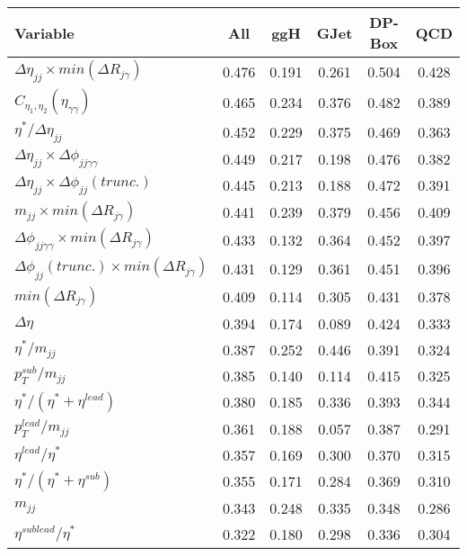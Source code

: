 \documentclass[a4paper,portrait]{article}
\begin{document}
\begin{center}
\begin{tabular}{| l || c | c | c | c | c |}
\hline
Variable & All & ggH & GJet & DP-Box & QCD \\ \hline
\rowcolor{Salmon}
$\Delta\eta_{jj}\times{min(\Delta{R}_{j\gamma})}$ & 0.476 & 0.191 & 0.261 & 0.504 & 0.428 \\ 
\rowcolor{Salmon}
$C_{\eta_{1},\eta_{2}}(\eta_{\gamma\gamma})$ & 0.465 & 0.234 & 0.376 & 0.482 & 0.389 \\ 
\rowcolor{Salmon}
$\eta^{*}/\Delta\eta_{jj}$ & 0.452 & 0.229 & 0.375 & 0.469 & 0.363 \\ 
\rowcolor{Salmon}
$\Delta\eta_{jj}\times\Delta\phi_{jj\gamma\gamma}$ & 0.449 & 0.217 & 0.198 & 0.476 & 0.382 \\ 
\rowcolor{Salmon}
$\Delta\eta_{jj}\times\Delta\phi_{jj}(trunc.)$ & 0.445 & 0.213 & 0.188 & 0.472 & 0.391 \\ 
\rowcolor{Salmon}
$m_{jj}\times{min(\Delta{R}_{j\gamma})}$ & 0.441 & 0.239 & 0.379 & 0.456 & 0.409 \\ 
\rowcolor{Salmon}
$\Delta\phi_{jj\gamma\gamma}\times{min(\Delta{R}_{j\gamma})}$ & 0.433 & 0.132 & 0.364 & 0.452 & 0.397 \\ 
\rowcolor{Salmon}
$\Delta\phi_{jj}(trunc.)\times{min(\Delta{R}_{j\gamma})}$ & 0.431 & 0.129 & 0.361 & 0.451 & 0.396 \\ 
\rowcolor{Salmon}
$min(\Delta{R}_{j\gamma})$ & 0.409 & 0.114 & 0.305 & 0.431 & 0.378 \\ 
$\Delta\eta$ & 0.394 & 0.174 & 0.089 & 0.424 & 0.333 \\ 
\rowcolor{Salmon}
$\eta^{*}/m_{jj}$ & 0.387 & 0.252 & 0.446 & 0.391 & 0.324 \\ 
\rowcolor{Salmon}
$p_{T}^{sub}/m_{jj}$ & 0.385 & 0.140 & 0.114 & 0.415 & 0.325 \\ 
\rowcolor{Salmon}
$\eta^{*}/(\eta^{*}+\eta^{lead})$ & 0.380 & 0.185 & 0.336 & 0.393 & 0.344 \\ 
\rowcolor{Salmon}
$p_{T}^{lead}/m_{jj}$ & 0.361 & 0.188 & 0.057 & 0.387 & 0.291 \\ 
\rowcolor{Salmon}
$\eta^{lead}/\eta^{*}$ & 0.357 & 0.169 & 0.300 & 0.370 & 0.315 \\ 
\rowcolor{Salmon}
$\eta^{*}/(\eta^{*}+\eta^{sub})$ & 0.355 & 0.171 & 0.284 & 0.369 & 0.310 \\ 
$m_{jj}$ & 0.343 & 0.248 & 0.335 & 0.348 & 0.286 \\ 
\rowcolor{Salmon}
$\eta^{sublead}/\eta^{*}$ & 0.322 & 0.180 & 0.298 & 0.336 & 0.304 \\ 

\end{tabular}
\end{center}
\end{document}
